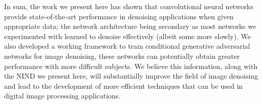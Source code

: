 In sum, the work we present here has shown that convolutional neural networks provide state-of-the-art performance in denoising applications when given appropriate data; the network architecture being secondary as most networks we experimented with learned to denoise effectively (albeit some more slowly). We also developed a working framework to train conditional generative adversarial networks for image denoising, these networks can potentially obtain greater performance with more difficult subjects. We believe this information, along with the \acl{NIND} we present here, will substantially improve the field of image denoising and lead to the development of more efficient techniques that can be used in digital image processing applications.





